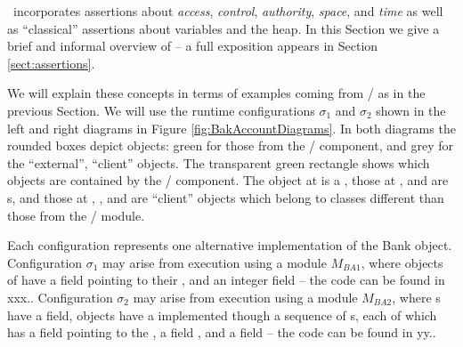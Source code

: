 

%
%
\Chainmail\ incorporates assertions   about 
%
\textit{access},
%
\textit{control},
%
\textit{authority},
%
\textit{space}, %
%
and
%
\textit{time}
%
as well as   ``classical'' assertions 
about  variables and the heap.
%
In this Section we  give a brief and informal  overview of %
\Chainmail -- a full exposition appears in Section \ref{sect:assertions}.



 We  will explain these concepts in terms of examples coming from  / as  in the previous Section.
We will use the runtime configurations $\sigma_1$ and $\sigma_2$ 
shown in the left and right diagrams in Figure \ref{fig:BakAccountDiagrams}.
In both diagrams the rounded boxes depict objects:  green for those from the 
/ component, and grey for the ``external'',  ``client'' objects.
The transparent green rectangle  shows which objects are contained by the / component.
The object at  is a , those at ,  and  are 
s, and those at , ,  and  are 
``client'' objects which belong to classes different than those from the /  module.

Each configuration represents one alternative implementation of the Bank object.
Configuration  $\sigma_1$ may arise from execution using a module $M_{BA1}$, where   objects of
  have a field  pointing to their , and an integer field  
-- the code can be found in xxx.. 
Configuration  $\sigma_2$ may arise from execution using a module $M_{BA2}$,  where s have a 
field,   objects  have a  implemented though a sequence of s, each of which has a 
 field pointing to the , a field , and a field   -- the code can be found in yy..

